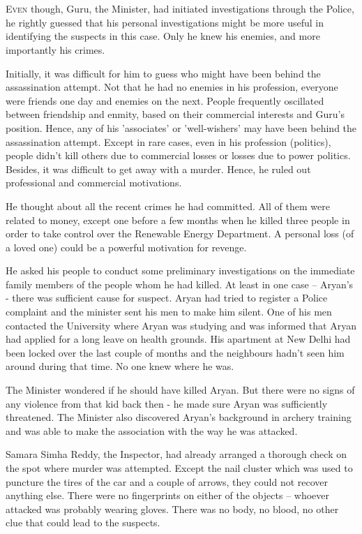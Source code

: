 \chapter{}

\lettrine{E}{ven} though, Guru, the Minister, had initiated investigations through the
Police, he rightly guessed that his personal investigations might be more useful
in identifying the suspects in this case. Only he knew his enemies, and more
importantly his crimes.

Initially, it was difficult for him to guess who might have been behind the
assassination attempt. Not that he had no enemies in his profession, everyone
were friends one day and enemies on the next. People frequently oscillated
between friendship and enmity, based on their commercial interests and Guru's
position. Hence, any of his 'associates' or 'well-wishers' may have been behind
the assassination attempt. Except in rare cases, even in his profession
(politics), people didn't kill others due to commercial losses or losses due to
power politics. Besides, it was difficult to get away with a murder. Hence, he
ruled out professional and commercial motivations.

He thought about all the recent crimes he had committed. All of them were
related to money, except one before a few months when he killed three people in
order to take control over the Renewable Energy Department. A personal loss (of
a loved one) could be a powerful motivation for revenge.

He asked his people to conduct some preliminary investigations on the immediate
family members of the people whom he had killed. At least in one case – Aryan's
- there was sufficient cause for suspect. Aryan had tried to register a Police
complaint and the minister sent his men to make him silent. One of his men
contacted the University where Aryan was studying and was informed that Aryan
had applied for a long leave on health grounds. His apartment at New Delhi had
been locked over the last couple of months and the neighbours hadn't seen him
around during that time. No one knew where he was.

The Minister wondered if he should have killed Aryan. But there were no signs of
any violence from that kid back then - he made sure Aryan was sufficiently
threatened. The Minister also discovered Aryan's background in archery training
and was able to make the association with the way he was attacked.

Samara Simha Reddy, the Inspector, had already arranged a thorough check on the
spot where murder was attempted. Except the nail cluster which was used to
puncture the tires of the car and a couple of arrows, they could not recover
anything else. There were no fingerprints on either of the objects – whoever
attacked was probably wearing gloves. There was no body, no blood, no other clue
that could lead to the suspects.

